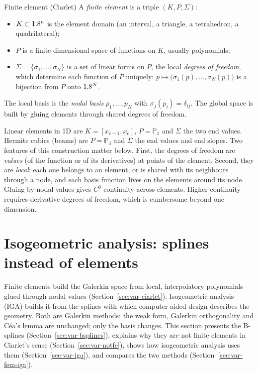\begin{gbox}{Finite element (Ciarlet)}
A \emph{finite element} is a triple $(K,P,\Sigma)$:
\begin{itemize}
\item $K\subset1.8^n$ is the element domain (an interval, a triangle, a
tetrahedron, a quadrilateral);
\item $P$ is a finite-dimensional space of functions on $K$, usually
polynomials;
\item $\Sigma=\{\sigma_1,\dots,\sigma_N\}$ is a set of linear forms on $P$, the
local \emph{degrees of freedom}, which determine each function of $P$
uniquely: $p\mapsto\bigl(\sigma_1(p),\dots,\sigma_N(p)\bigr)$ is a bijection
from $P$ onto $1.8^N$.
\end{itemize}
The local basis is the \emph{nodal basis} $p_1,\dots,p_N$ with
$\sigma_j(p_i)=\delta_{ij}$. The global space is built by gluing elements
through shared degrees of freedom.
\end{gbox}
Linear elements in 1D are $K=[x_{e-1},x_e]$, $P=\mathbb P_1$ and $\Sigma$ the
two end values. Hermite cubics (beams) are $P=\mathbb P_3$ and $\Sigma$ the end
values and end slopes. Two features of this construction matter below. First,
the degrees of freedom are \emph{values} (of the function or of its
derivatives) at points of the element. Second, they are \emph{local}: each
one belongs to an element, or is shared with its neighbours through a node,
and each basis function lives on the elements around its node. Gluing by
nodal values gives $C^0$ continuity across elements. Higher continuity
requires derivative degrees of freedom, which is cumbersome beyond one
dimension.

\section{Isogeometric analysis: splines instead of elements}\label{sec:var-igasec}
%
Finite elements build the Galerkin space from local, interpolatory
polynomials glued through nodal values (Section~\ref{sec:var-ciarlet}).
Isogeometric analysis (IGA) builds it from the splines with which
computer-aided design describes the geometry. Both are Galerkin methods: the
weak form, Galerkin orthogonality and C\'ea's lemma are unchanged; only the
basis changes. This section presents the B-splines
(Section~\ref{sec:var-bsplines}), explains why they are not finite elements in
Ciarlet's sense (Section~\ref{sec:var-notfe}), shows how isogeometric
analysis uses them (Section~\ref{sec:var-iga}), and compares the two methods
(Section~\ref{sec:var-fem-iga}).


